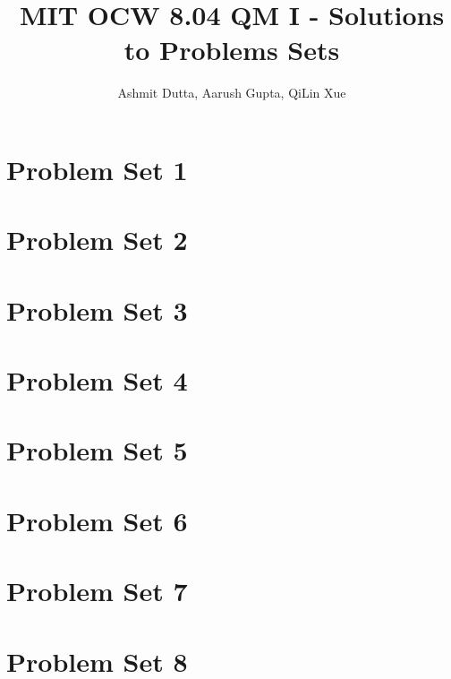 \documentclass{article}
\title{MIT OCW 8.04 QM I - Solutions to Problems Sets}
\author{Ashmit Dutta, Aarush Gupta, QiLin Xue}
\date{}
\begin{document}
\maketitle

\section*{Problem Set 1}








\newpage
\section*{Problem Set 2}






\newpage
\section*{Problem Set 3}







\newpage
\section*{Problem Set 4}





\newpage



\newpage
\section*{Problem Set 5}








\newpage
\section*{Problem Set 6}








\newpage
\section*{Problem Set 7}



\section*{Problem Set 8}

\end{document}
